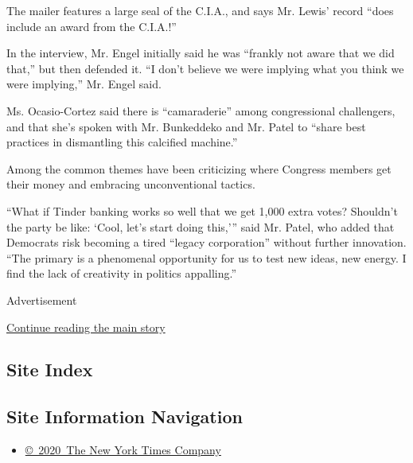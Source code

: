 The mailer features a large seal of the C.I.A., and says Mr. Lewis'
record ``does include an award from the C.I.A.!''

In the interview, Mr. Engel initially said he was ``frankly not aware
that we did that,'' but then defended it. ``I don't believe we were
implying what you think we were implying,'' Mr. Engel said.

Ms. Ocasio-Cortez said there is ``camaraderie'' among congressional
challengers, and that she's spoken with Mr. Bunkeddeko and Mr. Patel to
``share best practices in dismantling this calcified machine.''

Among the common themes have been criticizing where Congress members get
their money and embracing unconventional tactics.

``What if Tinder banking works so well that we get 1,000 extra votes?
Shouldn't the party be like: `Cool, let's start doing this,''' said Mr.
Patel, who added that Democrats risk becoming a tired ``legacy
corporation'' without further innovation. ``The primary is a phenomenal
opportunity for us to test new ideas, new energy. I find the lack of
creativity in politics appalling.''

Advertisement

\protect\hyperlink{after-bottom}{Continue reading the main story}

\hypertarget{site-index}{%
\subsection{Site Index}\label{site-index}}

\hypertarget{site-information-navigation}{%
\subsection{Site Information
Navigation}\label{site-information-navigation}}

\begin{itemize}
\tightlist
\item
  \href{https://help.nytimes.com/hc/en-us/articles/115014792127-Copyright-notice}{©~2020~The
  New York Times Company}
\end{itemize}

